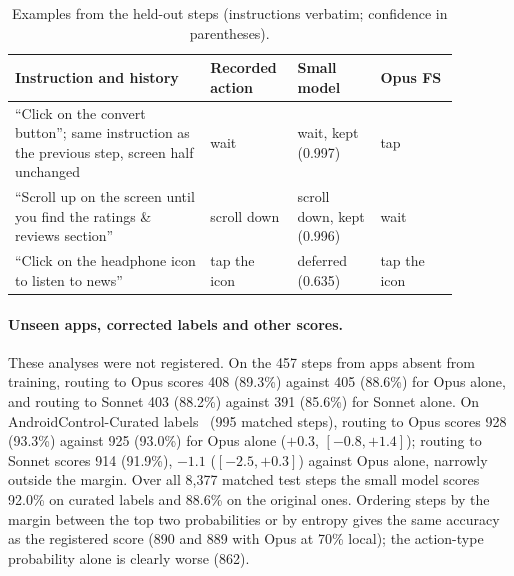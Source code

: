 \documentclass[10pt]{article}
\begin{document}
\begin{table}[t]\centering\small
\caption{Examples from the held-out steps (instructions verbatim; confidence in parentheses).}\label{tab:examples}
\begin{tabular}{p{0.40\linewidth}p{0.15\linewidth}p{0.17\linewidth}p{0.16\linewidth}}\toprule
Instruction and history & Recorded action & Small model & Opus FS\\\midrule
``Click on the convert button''; same instruction as the previous step, screen half unchanged & wait & wait, kept (0.997) & tap\\
``Scroll up on the screen until you find the ratings \& reviews section'' & scroll down & scroll down, kept (0.996) & wait\\
``Click on the headphone icon to listen to news'' & tap the icon & deferred (0.635) & tap the icon\\\bottomrule
\end{tabular}\end{table}

\paragraph{Unseen apps, corrected labels and other scores.} These analyses were not registered. On the 457 steps from apps absent from training, routing to Opus scores 408 (89.3\%) against 405 (88.6\%) for Opus alone, and routing to Sonnet 403 (88.2\%) against 391 (85.6\%) for Sonnet alone. On AndroidControl-Curated labels~\citep{accurated} (995 matched steps), routing to Opus scores 928 (93.3\%) against 925 (93.0\%) for Opus alone ($+0.3$, $[-0.8, +1.4]$); routing to Sonnet scores 914 (91.9\%), $-1.1$ ($[-2.5, +0.3]$) against Opus alone, narrowly outside the margin. Over all 8{,}377 matched test steps the small model scores 92.0\% on curated labels and 88.6\% on the original ones. Ordering steps by the margin between the top two probabilities or by entropy gives the same accuracy as the registered score (890 and 889 with Opus at 70\% local); the action-type probability alone is clearly worse (862).
\end{document}
